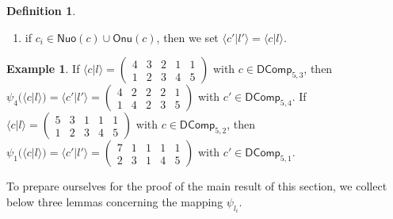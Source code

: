 \documentclass[reqno]{amsart}
\numberwithin{equation}{section}
\theoremstyle{definition}
\newtheorem{definition}{Definition}[section]
\newtheorem{example}{Example}[section]
\theoremstyle{named}
\def\DComp{\mathsf{DComp}}
\def\Nuo{\mathsf{Nuo}}
\def\Onu{\mathsf{Onu}}
\begin{document}
\begin{definition}
\begin{enumerate}
\begin{align*}
\begin{cases}
			c_t^{\prime}=c_t& \text{ otherwise,}
		\end{cases}
	\text{ and }
	\begin{cases}
			l_t^{\prime}=l_i  &  \text{ if $t=j$, } \\
			l_t^{\prime}=l_{t-1}& \text{ if $j+1\le t\le i$,}  \\
			l_t^{\prime}=l_t& \text{ otherwise. }
	\end{cases}
	\end{align*}	
	\item if $c_i\in\Nuo(c)\cup \Onu(c)$, then we set $\langle c'|l'\rangle=\langle c|l\rangle$.
\end{enumerate}
\end{definition}

\begin{example}
If $\langle c|l\rangle =\begin{pmatrix}
4 & 3 & 2 & 1 & 1\\
1 & 2 & 3 & 4 & 5
\end{pmatrix}$ with $c\in \DComp_{5,3}$, then $\psi_4(\langle c|l\rangle)=\langle c'|l'\rangle=
\begin{pmatrix}
4 & 2 & 2 & 2 & 1\\
1 & 4 & 2 & 3 & 5
\end{pmatrix}$ with $c'\in \DComp_{5,4}$. If $\langle c|l\rangle=
\begin{pmatrix}
5 & 3 & 1 & 1 & 1\\
1 & 2 & 3 & 4 & 5
\end{pmatrix}$ with $c\in \DComp_{5,2}$, then $\psi_1(\langle c|l\rangle)=\langle c'|l'\rangle=
\begin{pmatrix}
7 & 1 & 1 & 1 & 1\\
2 & 3 & 1 & 4 & 5
\end{pmatrix}$
with $c'\in \DComp_{5,1}$.
\end{example}

To prepare ourselves for the proof of the main result of this section, we collect below three lemmas concerning the mapping $\psi_{l_i}$.
\end{document}
